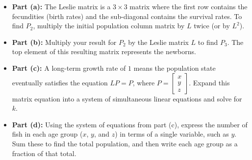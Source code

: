 \begin{hint}
\begin{itemize}
    \item \textbf{Part (a):} The Leslie matrix is a $3 \times 3$ matrix where the first row contains the fecundities (birth rates) and the sub-diagonal contains the survival rates. To find $P_2$, multiply the initial population column matrix by $L$ twice (or by $L^2$).
    \item \textbf{Part (b):} Multiply your result for $P_2$ by the Leslie matrix $L$ to find $P_3$. The top element of this resulting matrix represents the newborns.
    \item \textbf{Part (c):} A long-term growth rate of $1$ means the population state eventually satisfies the equation $L P = P$, where $P = \begin{bmatrix} x \\ y \\ z \end{bmatrix}$. Expand this matrix equation into a system of simultaneous linear equations and solve for $k$.
    \item \textbf{Part (d):} Using the system of equations from part (c), express the number of fish in each age group ($x$, $y$, and $z$) in terms of a single variable, such as $y$. Sum these to find the total population, and then write each age group as a fraction of that total.
\end{itemize}
\end{hint}

